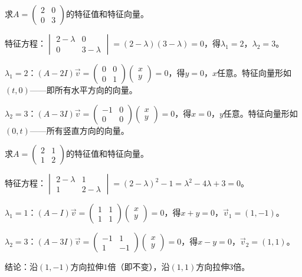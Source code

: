 \begin{example}
求$A=\begin{pmatrix}2&0\\0&3\end{pmatrix}$的特征值和特征向量。
\end{example}
\begin{solution}
特征方程：$\begin{vmatrix}2-\lambda&0\\0&3-\lambda\end{vmatrix}=(2-\lambda)(3-\lambda)=0$，得$\lambda_1=2$，$\lambda_2=3$。

$\lambda_1=2$：$(A-2I)\vec v=\begin{pmatrix}0&0\\0&1\end{pmatrix}\begin{pmatrix}x\\y\end{pmatrix}=0$，得$y=0$，$x$任意。特征向量形如$(t,0)$——即所有水平方向的向量。

$\lambda_2=3$：$(A-3I)\vec v=\begin{pmatrix}-1&0\\0&0\end{pmatrix}\begin{pmatrix}x\\y\end{pmatrix}=0$，得$x=0$，$y$任意。特征向量形如$(0,t)$——所有竖直方向的向量。
\end{solution}

\begin{example}
求$A=\begin{pmatrix}2&1\\1&2\end{pmatrix}$的特征值和特征向量。
\end{example}
\begin{solution}
特征方程：$\begin{vmatrix}2-\lambda&1\\1&2-\lambda\end{vmatrix}=(2-\lambda)^2-1=\lambda^2-4\lambda+3=0$。

$\lambda_1=1$：$(A-I)\vec v=\begin{pmatrix}1&1\\1&1\end{pmatrix}\begin{pmatrix}x\\y\end{pmatrix}=0$，得$x+y=0$，$\vec v_1=(1,-1)$。

$\lambda_2=3$：$(A-3I)\vec v=\begin{pmatrix}-1&1\\1&-1\end{pmatrix}\begin{pmatrix}x\\y\end{pmatrix}=0$，得$x-y=0$，$\vec v_2=(1,1)$。

结论：沿$(1,-1)$方向拉伸$1$倍（即不变），沿$(1,1)$方向拉伸$3$倍。
\end{solution}

